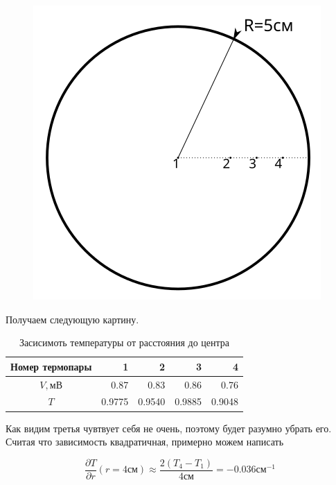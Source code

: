 \documentclass[a4paper, 12pt]{article}
\begin{document}
    \begin{figure}[h]
        \begin{center}
            \includegraphics[width=0.5\linewidth]{radial}
        \end{center}
    \end{figure}

    Получаем следующую картину.

    \begin{table}[h]
        \begin{center}
            \begin{tabular}{|c|r|r|r|r|}
                \hline
                Номер термопары & 1 &  2 &  3 &  4\\
                \hline
                $V, мВ$ &   0.87 &  0.83 &  0.86 &  0.76\\
                \hline
                $T$ & 0.9775 & 0.9540 & 0.9885 & 0.9048\\
                \hline
            \end{tabular}
            \caption{Засисимоть температуры от расстояния до центра}
        \end{center}
    \end{table}

    Как видим третья чувтвует себя не очень, поэтому будет разумно убрать его. Считая что зависимость квадратичная, примерно можем написать

    \begin{equation}
        \frac{\partial T}{\partial r}(r=4см) \approx \frac{2(T_4-T_1)}{4см} = -0.036 см^{-1}
    \end{equation}
\end{document}
